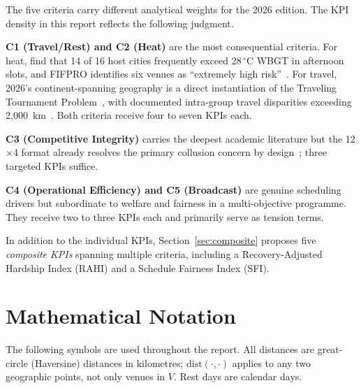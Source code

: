 \documentclass[12pt, letterpaper]{article}
\begin{document}
The five criteria carry different analytical weights for the 2026 edition.
The KPI density in this report reflects the following judgment.

\textbf{C1 (Travel/Rest) and C2 (Heat)} are the most consequential
criteria.  For heat, \citet{MullanEtAl2025} find that 14 of 16 host cities
frequently exceed 28\,$^\circ$C WBGT in afternoon slots, and FIFPRO identifies
six venues as ``extremely high risk''~\citep{FIFPRO2025}.  For travel,
2026's continent-spanning geography is a direct instantiation of the
Traveling Tournament Problem~\citep{Easton2001}, with documented intra-group
travel disparities exceeding 2{,}000~km~\citep{MikamiTravel2026}.  Both
criteria receive four to seven KPIs each.

\textbf{C3 (Competitive Integrity)} carries the deepest academic literature
but the 12$\times$4 format already resolves the primary collusion concern by
design~\citep{GuajardoKrumer2024, FIFA2023Format}; three targeted KPIs
suffice.

\textbf{C4 (Operational Efficiency) and C5 (Broadcast)} are genuine
scheduling drivers but subordinate to welfare and fairness in a multi-objective
programme.  They receive two to three KPIs each and primarily serve as
tension terms.

In addition to the individual KPIs, Section~\ref{sec:composite} proposes five
\emph{composite KPIs} spanning multiple criteria, including a
Recovery-Adjusted Hardship Index (RAHI) and a Schedule Fairness Index (SFI).

\section{Mathematical Notation}

The following symbols are used throughout the report.  All distances are
great-circle (Haversine) distances in kilometres; $\mathrm{dist}(\cdot,\cdot)$
applies to any two geographic points, not only venues in $V$.
Rest days are calendar days.
\end{document}
